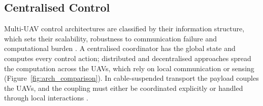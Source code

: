 
\subsection{Centralised Control}

Multi-UAV control architectures are classified by their information structure, which sets their scalability, robustness to communication failure and computational burden \cite{nathanReviewAutonomousMultiagent2011}. A centralised coordinator has the global state and computes every control action; distributed and decentralised approaches spread the computation across the UAVs, which rely on local communication or sensing (Figure~\ref{fig:arch_comparison}). In cable-suspended transport the payload couples the UAVs, and the coupling must either be coordinated explicitly or handled through local interactions \cite{brambillaSwarmRoboticsReview2013}.

